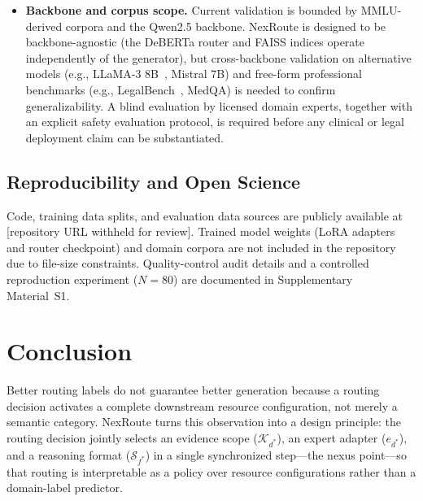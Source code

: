 \documentclass[a4paper,fleql,doubleblind]{cas-sc}
\begin{document}
\begin{itemize}
\item \textbf{Backbone and corpus scope.} Current validation is bounded by MMLU-derived corpora and the Qwen2.5
backbone. NexRoute is designed to be backbone-agnostic (the DeBERTa router
and FAISS indices operate independently of the generator), but cross-backbone
validation on alternative models (e.g., LLaMA-3 8B~\citep{grattafiori2024llama3},
Mistral 7B) and free-form professional benchmarks (e.g.,
LegalBench~\citep{guha2023legalbench}, MedQA) is needed to confirm
generalizability. A blind evaluation by licensed domain experts, together
with an explicit safety evaluation protocol, is required before any clinical
or legal deployment claim can be substantiated.
\end{itemize}
\subsection{Reproducibility and Open Science}
\label{sec:reproducibility}
Code, training data splits, and evaluation data sources are publicly available at [repository URL withheld for review]. Trained model weights (LoRA adapters and router checkpoint) and domain corpora are not included in the repository due to file-size constraints. Quality-control audit details and a controlled reproduction experiment ($N{=}80$) are documented in Supplementary Material~S1.

\section{Conclusion}
\label{sec:conclusion}

Better routing labels do not guarantee better generation because a routing decision
activates a complete downstream resource configuration, not merely a semantic category.
NexRoute turns this observation into a design principle: the routing decision jointly
selects an evidence scope ($\mathcal{K}_{d^*}$), an expert adapter ($e_{d^*}$), and
a reasoning format ($\mathcal{S}_{f^*}$) in a single synchronized step---the nexus
point---so that routing is interpretable as a policy over resource configurations
rather than a domain-label predictor.
\end{document}
